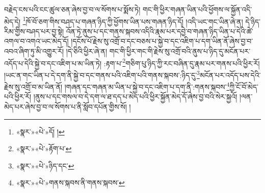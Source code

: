 བརྗེད་ངས་པའི་ངང་ཚུལ་ཅན་ཞེས་བྱ་བ་ལ་སོགས་པ་སྨོས་ཏེ། གང་གི་ཕྱིར་གཞན་ཡིན་པའི་ཕྱོགས་ལ་སྐྱོན་འདི་མེད་དེ། \footnote{«སྣར་»«པེ་»དོ། ། }ཁོ་བོ་ཅག་གིས་བཤད་པ་གཞན་ཉིད་ཀྱི་ཕྱོགས་ཡིན་པས་གཞན་ཉིད་དོ། །འདི་ཡང་གང་ཡིན་ཞེ་ན། དེ་ཉིད་རིམ་གྱིས་བཤད་པར་བྱ་སྟེ། འོན་ཏེ་ནུས་པ་དང་གནས་སྐབས་འདིའི་རྣམ་པར་དབྱེ་བ་གཞན་ཉིད་ཡིན་པ་དེའི་ཚེ་འགལ་བ་འགའ་ཡང་མེད་དོ། །དངོས་པོ་རྗེས་སུ་འགྲོ་བ་དང་བཅས་པ་སྐྱེ་བ་དང་འཇིག་པ་དག་ཡིན་ནོ་ཞེས་བྱ་བ་འབའ་ཞིག་ཏུ་མི་འགྱུར་རོ། །དེ་ཅིའི་ཕྱིར་ཞེ་ན། གང་གི་ཕྱིར་གང་གི་རྗེས་སུ་འགྲོ་བའི་ནུས་པ་ཉིད་དུ་མངོན་པར་འདོད་པ་དེའི་སྐྱེ་བ་དང་འཇིག་པ་མ་ཡིན་ཏེ། :རྟག་པ་\footnote{«སྣར་»«པེ་»རྟོག་པ་}གཅིག་པུ་ཉིད་ཀྱི་རང་བཞིན་དུ་རྣམ་པར་གནས་པའི་ཕྱིར་རོ། །ཡང་ན་གང་ཡིན་པ་དེ་དག་ནི་སྐྱེ་བ་དང་གནས་པའི་འཇིག་པའི་གནས་སྐབས་:ཉིད་དུ་\footnote{«སྣར་»«པེ་»ཉིད་དང་}མངོན་པར་འདོད་པས་དེའི་རྗེས་སུ་འགྲོ་བ་མ་ཡིན་ནོ། །གཞན་དང་གཞན་མ་ཡིན་པ་སྐྱེ་བ་དང་འཇིག་པ་དག་ནི་:གནས་སྐབས་\footnote{«སྣར་»«པེ་»གནས་སྐབས་ནི་གནས་སྐབས་}ཀྱི་ངོ་བོ་མེད་པའི་ཕྱིར་རོ། །ནུས་པ་དང་གསལ་བ་དེ་དག་ལ་ཐ་དད་པ་མེད་པའི་ཕྱིར་སྐྱོན་མེད་དོ་ཞེས་བྱ་བའི་སེར་སྐྱའོ། །ལན་མེད་པར་ཞེས་བྱ་བ་ལ་སོགས་པ་ནི་སློབ་དཔོན་གྱིས་སོ། །
